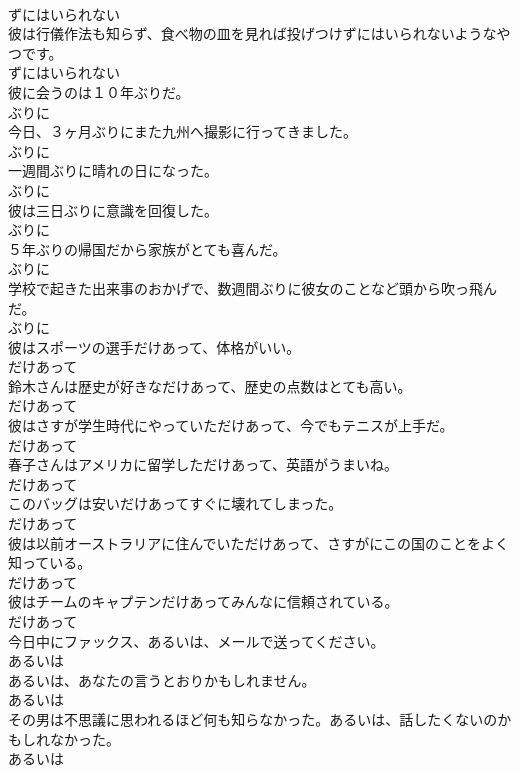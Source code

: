 \documentclass[8pt]{extreport}
\begin{document}
\begin{CJK}{UTF8}{min}
\\	ずにはいられない
\\	彼は行儀作法も知らず、食べ物の皿を見れば投げつけずにはいられないようなやつです。	
\\	ずにはいられない
\\	彼に会うのは１０年ぶりだ。	
\\	ぶりに
\\	今日、３ヶ月ぶりにまた九州へ撮影に行ってきました。	
\\	ぶりに
\\	一週間ぶりに晴れの日になった。	
\\	ぶりに
\\	彼は三日ぶりに意識を回復した。	
\\	ぶりに
\\	５年ぶりの帰国だから家族がとても喜んだ。	
\\	ぶりに
\\	学校で起きた出来事のおかげで、数週間ぶりに彼女のことなど頭から吹っ飛んだ。	
\\	ぶりに
\\	彼はスポーツの選手だけあって、体格がいい。	
\\	だけあって
\\	鈴木さんは歴史が好きなだけあって、歴史の点数はとても高い。	
\\	だけあって
\\	彼はさすが学生時代にやっていただけあって、今でもテニスが上手だ。	
\\	だけあって
\\	春子さんはアメリカに留学しただけあって、英語がうまいね。	
\\	だけあって
\\	このバッグは安いだけあってすぐに壊れてしまった。	
\\	だけあって
\\	彼は以前オーストラリアに住んでいただけあって、さすがにこの国のことをよく知っている。	
\\	だけあって
\\	彼はチームのキャプテンだけあってみんなに信頼されている。	
\\	だけあって
\\	今日中にファックス、あるいは、メールで送ってください。	
\\	あるいは
\\	あるいは、あなたの言うとおりかもしれません。	
\\	あるいは
\\	その男は不思議に思われるほど何も知らなかった。あるいは、話したくないのかもしれなかった。	
\\	あるいは

\end{CJK}
\end{document}
